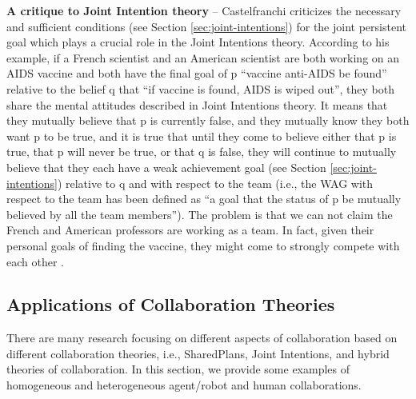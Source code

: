 \documentclass[12pt]{report}
\begin{document}
\textbf{A critique to Joint Intention theory} -- Castelfranchi criticizes the
necessary and sufficient conditions (see Section \ref{sec:joint-intentions}) for
the joint persistent goal which plays a crucial role in the Joint Intentions
theory. According to his example, if a French scientist and an American
scientist are both working on an AIDS vaccine and both have the final goal of p
``vaccine anti-AIDS be found'' relative to the belief q that ``if vaccine is
found, AIDS is wiped out'', they both share the mental attitudes described
in Joint Intentions theory. It means that they mutually believe that p is
currently false, and they mutually know they both want p to be true, and it is
true that until they come to believe either that p is true, that p will never be
true, or that q is false, they will continue to mutually believe that they each
have a weak achievement goal (see Section \ref{sec:joint-intentions}) relative
to q and with respect to the team (i.e., the WAG with respect to the team has
been defined as ``a goal that the status of p be mutually  believed by all the
team members''). The problem is that we can not claim the French and American
professors are working as a team. In fact, given their personal goals of finding
the vaccine, they might come to strongly compete with each other
\cite{castelfranchi:commitments-aids}.

\subsection{Applications of Collaboration Theories}
\label{sec:applicaiton}

There are many research focusing on different aspects of collaboration based on
different collaboration theories, i.e., SharedPlans, Joint Intentions, and
hybrid theories of collaboration. In this section, we provide some examples of
homogeneous and heterogeneous agent/robot and human collaborations.
\end{document}
